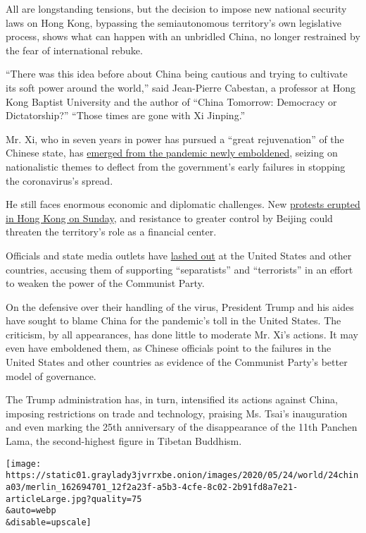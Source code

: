 All are longstanding tensions, but the decision to impose new national
security laws on Hong Kong, bypassing the semiautonomous territory's own
legislative process, shows what can happen with an unbridled China, no
longer restrained by the fear of international rebuke.

``There was this idea before about China being cautious and trying to
cultivate its soft power around the world,'' said Jean-Pierre Cabestan,
a professor at Hong Kong Baptist University and the author of ``China
Tomorrow: Democracy or Dictatorship?'' ``Those times are gone with Xi
Jinping.''

Mr. Xi, who in seven years in power has pursued a ``great rejuvenation''
of the Chinese state, has
\href{https://www.nytimes3xbfgragh.onion/2020/05/20/world/asia/coronavirus-china-xi-jinping.html}{emerged
from the pandemic newly emboldened}, seizing on nationalistic themes to
deflect from the government's early failures in stopping the
coronavirus's spread.

He still faces enormous economic and diplomatic challenges. New
\href{https://www.nytimes3xbfgragh.onion/2020/05/24/world/asia/hong-kong-protest-coronavirus-china.html}{protests
erupted in Hong Kong on Sunday}, and resistance to greater control by
Beijing could threaten the territory's role as a financial center.

Officials and state media outlets have
\href{https://www.nytimes3xbfgragh.onion/2020/05/23/world/asia/china-hong-kong-propaganda.html}{lashed
out} at the United States and other countries, accusing them of
supporting ``separatists'' and ``terrorists'' in an effort to weaken the
power of the Communist Party.

On the defensive over their handling of the virus, President Trump and
his aides have sought to blame China for the pandemic's toll in the
United States. The criticism, by all appearances, has done little to
moderate Mr. Xi's actions. It may even have emboldened them, as Chinese
officials point to the failures in the United States and other countries
as evidence of the Communist Party's better model of governance.

The Trump administration has, in turn, intensified its actions against
China, imposing restrictions on trade and technology, praising Ms.
Tsai's inauguration and even marking the 25th anniversary of the
disappearance of the 11th Panchen Lama, the second-highest figure in
Tibetan Buddhism.

\texttt{[image: https://static01.graylady3jvrrxbe.onion/images/2020/05/24/world/24china03/merlin\_162694701\_12f2a23f-a5b3-4cfe-8c02-2b91fd8a7e21-articleLarge.jpg?quality=75\\\&auto=webp\\\&disable=upscale]}

